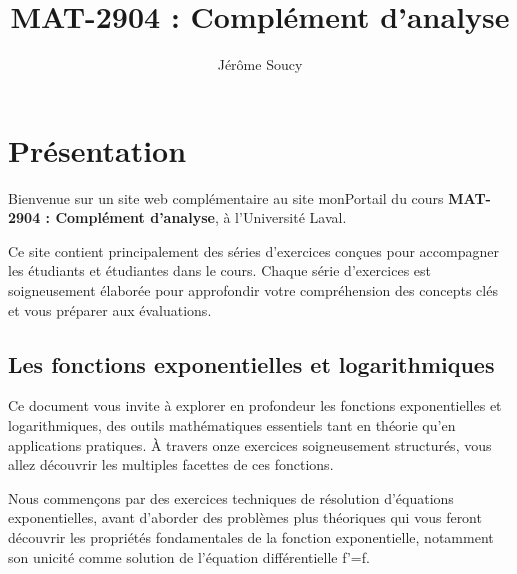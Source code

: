 \documentclass[
  12pt,
  letterpaper,
]{book}
\title{MAT-2904 : Complément d'analyse}
\author{Jérôme Soucy}
\date{}
\renewcommand*\contentsname{Table des matières}
\newcommand\contentsname{Table des matières}
\theoremstyle{remark}
\begin{document}
\frontmatter
\maketitle
\ifdefined\Shaded\renewenvironment{Shaded}{\begin{tcolorbox}[interior hidden, boxrule=0pt, sharp corners, borderline west={3pt}{0pt}{shadecolor}, breakable, frame hidden, enhanced]}{\end{tcolorbox}}\fi

\renewcommand*\contentsname{Table des matières}
{
\hypersetup{linkcolor=}
\setcounter{tocdepth}{2}
\tableofcontents
}
\listoffigures
\listoftables
\mainmatter
{}

\hypertarget{pruxe9sentation}{%
\chapter*{Présentation}\label{pruxe9sentation}}


Bienvenue sur un site web complémentaire au site monPortail du cours
\textbf{MAT-2904 : Complément d'analyse}, à l'Université Laval.

Ce site contient principalement des séries d'exercices conçues pour
accompagner les étudiants et étudiantes dans le cours. Chaque série
d'exercices est soigneusement élaborée pour approfondir votre
compréhension des concepts clés et vous préparer aux évaluations.

\hypertarget{les-fonctions-exponentielles-et-logarithmiques}{%
\section*{Les fonctions exponentielles et
logarithmiques}\label{les-fonctions-exponentielles-et-logarithmiques}}


Ce document vous invite à explorer en profondeur les fonctions
exponentielles et logarithmiques, des outils mathématiques essentiels
tant en théorie qu'en applications pratiques. À travers onze exercices
soigneusement structurés, vous allez découvrir les multiples facettes de
ces fonctions.

Nous commençons par des exercices techniques de résolution d'équations
exponentielles, avant d'aborder des problèmes plus théoriques qui vous
feront découvrir les propriétés fondamentales de la fonction
exponentielle, notamment son unicité comme solution de l'équation
différentielle f'=f.
\end{document}
